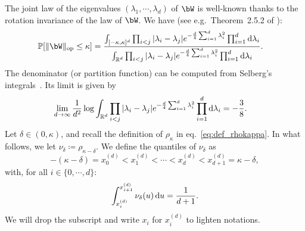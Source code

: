 \myskip 
The joint law of the eigenvalues $(\lambda_1, \cdots, \lambda_d)$ of $\bW$ is well-known thanks to the rotation invariance of the law of $\bW$. 
We have (see e.g.\ Theorem~2.5.2 of \cite{anderson2010introduction}):
\begin{align}\label{eq:joint_law_evalues}
    \bbP[\|\bW\|_\op \leq \kappa] &= \frac{\int_{[-\kappa,\kappa]^d} \prod_{i < j} |\lambda_i - \lambda_j| e^{-\frac{d}{4} \sum_{i=1}^d \lambda_i^2} \prod_{i=1}^d \rd \lambda_i}{\int_{\bbR^d} \prod_{i < j} |\lambda_i - \lambda_j| e^{-\frac{d}{4} \sum_{i=1}^d \lambda_i^2} \prod_{i=1}^d \rd \lambda_i}.
\end{align}
The denominator (or partition function) can be computed from Selberg's integrals~\citep{mehta2014random}.
Its limit is given by
\begin{align}\label{eq:part_function_selberg}
    \lim_{d \to \infty} \frac{1}{d^2} \log \int_{\mathbb{R}^d} \prod_{i < j} |\lambda_i - \lambda_j| e^{-\frac{d}{4} \sum_{i=1}^d \lambda_i^2} \prod_{i=1}^d \mathrm{d} \lambda_i 
    &= - \frac{3}{8}.
\end{align}
Let $\delta \in (0,\kappa)$, and recall the definition of $\rho_\kappa$ in eq.~\eqref{eq:def_rhokappa}.
In what follows, we let $\nu_\delta \coloneqq \rho_{\kappa - \delta}$.
We define the quantiles of $\nu_\delta$ as 
\begin{equation*}
    -(\kappa-\delta) = x_0^{(d)} < x_1^{(d)} < \cdots < x_d^{(d)} < x_{d+1}^{(d)} = \kappa - \delta, 
\end{equation*}
with, for all $i \in \{0, \cdots, d\}$:
\begin{equation*}
    \int_{x_i^{(d)}}^{x_{i+1}^{(d)}} \nu_\delta(u) \, \mathrm{d} u = \frac{1}{d+1}. 
\end{equation*}
We will drop the subscript and write $x_i$ for $x_i^{(d)}$ to lighten notations.

